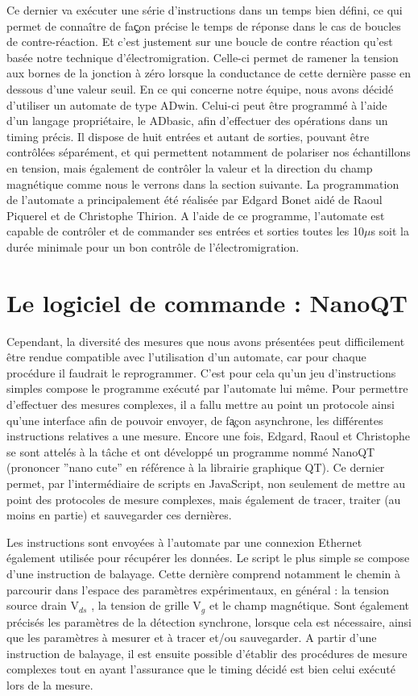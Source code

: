 Ce dernier va exécuter une série d’instructions dans un temps bien défini, ce qui permet de connaître de faç̧on précise le temps de réponse dans le cas de boucles de contre-réaction. Et c’est justement sur une boucle de contre réaction qu’est basée notre technique d’électromigration. Celle-ci permet de ramener la tension aux bornes de la jonction à zéro lorsque la conductance de cette dernière passe en dessous d’une valeur seuil. En ce qui concerne notre équipe, nous avons décidé d’utiliser un automate de type ADwin. Celui-ci peut être programmé à l’aide d’un langage propriétaire, le ADbasic, afin d’effectuer des opérations dans un timing précis. Il dispose de huit entrées et autant de sorties, pouvant être contrôlées séparément, et qui permettent notamment de polariser nos échantillons en tension, mais également de contrôler la valeur et la direction du champ magnétique comme nous le verrons dans la section suivante. La programmation de l’automate a principalement été réalisée par Edgard Bonet aidé de Raoul Piquerel et de Christophe Thirion. A l’aide de ce programme, l’automate est capable de contrôler et de commander ses entrées et sorties toutes les 10$\mu$s soit la durée minimale pour un bon contrôle de l’électromigration.

\section{Le logiciel de commande : NanoQT}
Cependant, la diversité des mesures que nous avons présentées peut difficilement être rendue compatible avec l’utilisation d’un automate, car pour chaque procédure il faudrait le reprogrammer. C’est pour cela qu’un jeu d’instructions simples compose le programme exécuté par l’automate lui même. Pour permettre d’effectuer des mesures complexes, il a fallu mettre au point un protocole ainsi qu’une interface afin de pouvoir envoyer, de fa̧çon asynchrone, les différentes instructions relatives a une mesure. Encore une fois, Edgard, Raoul et Christophe se sont attelés à la tâche et ont développé un programme nommé NanoQT (prononcer ”nano cute” en référence à la librairie graphique QT). Ce dernier permet, par l’intermédiaire de scripts en JavaScript, non seulement de mettre au point des protocoles de mesure complexes, mais également de tracer, traiter (au moins en partie) et sauvegarder ces dernières.


Les instructions sont envoyées à l’automate par une connexion Ethernet également utilisée pour récupérer les données. Le script le plus simple se compose d’une instruction de balayage. Cette dernière comprend notamment le
chemin à parcourir dans l’espace des paramètres expérimentaux, en général : la tension source drain V$_{ds}$ , la tension de grille V$_g$ et le champ magnétique. Sont également précisés les paramètres de la détection synchrone, lorsque cela est nécessaire, ainsi que les paramètres à mesurer et à tracer et/ou sauvegarder. A partir d’une instruction de balayage, il est ensuite possible d’établir des procédures de mesure complexes tout en ayant l’assurance que le timing décidé est bien celui exécuté lors de la mesure.


